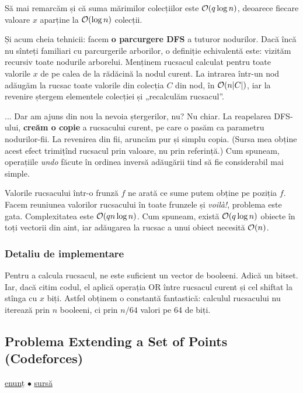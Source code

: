 \documentclass[../main.tex]{subfiles}
\begin{document}
Să mai remarcăm și că suma mărimilor colecțiilor este $\mathcal{O}(q \log n)$, deoarece fiecare valoare $x$ aparține la $\mathcal{O}(\log n)$ colecții.

Și acum cheia tehnicii: facem \textbf{o parcurgere DFS} a tuturor nodurilor. Dacă încă nu sînteți familiari cu parcurgerile arborilor, o definiție echivalentă este: vizităm recursiv toate nodurile arborelui. Menținem rucsacul calculat pentru toate valorile $x$ de pe calea de la rădăcină la nodul curent. La intrarea într-un nod adăugăm la rucsac toate valorile din colecția $C$ din nod, în $\mathcal{O}(n |C|)$, iar la revenire ștergem elementele colecției și „recalculăm rucsacul”.

... Dar am ajuns din nou la nevoia ștergerilor, nu? Nu chiar. La reapelarea DFS-ului, \textbf{creăm o copie} a rucsacului curent, pe care o pasăm ca parametru nodurilor-fii. La revenirea din fii, aruncăm pur și simplu copia. (Sursa mea obține acest efect trimițînd rucsacul prin valoare, nu prin referință.) Cum spuneam, operațiile \textit{undo} făcute în ordinea inversă adăugării tind să fie considerabil mai simple.

Valorile rucsacului într-o frunză $f$ ne arată ce sume putem obține pe poziția $f$. Facem reuniunea valorilor rucsacului în toate frunzele și \textit{voilà!}, problema este gata. Complexitatea este $\mathcal{O}(qn \log n)$. Cum spuneam, există $\mathcal{O}(q \log n)$ obiecte în toți vectorii din aint, iar adăugarea la rucsac a unui obiect necesită $\mathcal{O}(n)$.

\subsubsection*{Detaliu de implementare}

Pentru a calcula rucsacul, ne este suficient un vector de booleeni. Adică un bitset. Iar, dacă citim codul, el aplică operația OR între rucsacul curent și cel shiftat la stînga cu $x$ biți. Astfel obținem o constantă fantastică: calculul rucsacului nu iterează prin $n$ booleeni, ci prin $n/64$ valori pe 64 de biți.


\subsection{Problema Extending a Set of Points (Codeforces)}
\label{problem:extending-a-set-of-points}

\href{https://codeforces.com/contest/1140/problem/F}{enunț}
$\bullet$
\hyperref[code:extending-a-set-of-points]{sursă}
\end{document}
